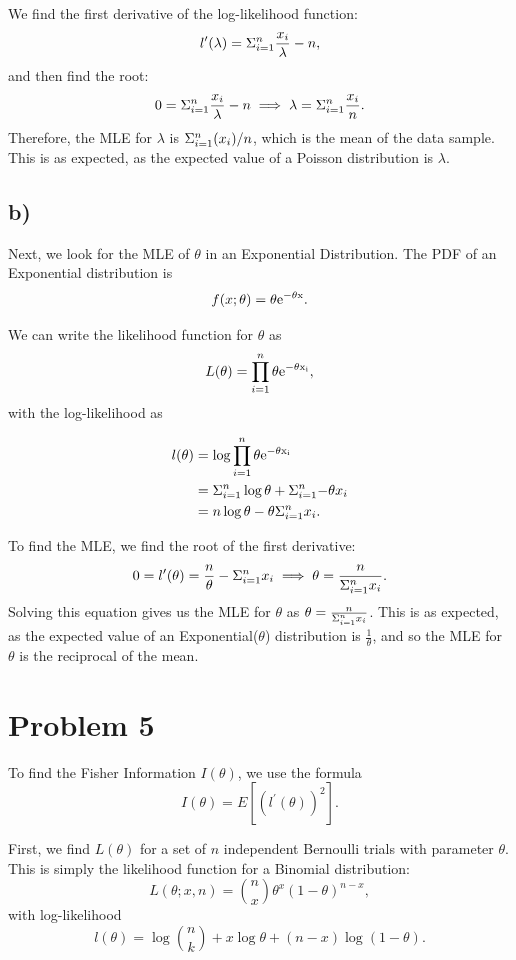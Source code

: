 \documentclass[]{article}
\begin{document}
We find the first derivative of the log-likelihood function: \[
l^{\prime}(\lambda) = \Sigma_{i=1}^{n} \frac{x_i}{\lambda} - n,
\] and then find the root: \[
 0 = \Sigma_{i=1}^{n} \frac{x_i}{\lambda} - n \implies \lambda = \Sigma_{i=1}^{n} \frac{x_i}{n}.
 \] Therefore, the MLE for \(\lambda\) is \(\Sigma_{i=1}^{n}(x_i) / n\), which is
the mean of the data sample. This is as expected, as the expected value
of a Poisson distribution is \(\lambda\).

\subsection{b)}\label{b-3}

Next, we look for the MLE of \(\theta\) in an Exponential Distribution.
The PDF of an Exponential distribution is \[
f(x; \theta) = \theta \rm{e}^{-\theta x}.
\]

We can write the likelihood function for \(\theta\) as \[
L(\theta) = \prod_{i=1}^{n}\theta\rm{e}^{-\theta x_i}, 
\] with the log-likelihood as

\begin{align*}
l(\theta) &= \log{\prod_{i=1}^{n}\theta\rm{e}^{-\theta x_i}} \\
&= \Sigma_{i=1}^{n} \log{\theta} + \Sigma_{i=1}^{n}{-\theta x_i} \\
&= n \log{\theta} - \theta \Sigma_{i=1}^{n} x_i.
\end{align*}

To find the MLE, we find the root of the first derivative: \[
0 = l^{\prime}(\theta) = \frac{n}{\theta} -  \Sigma_{i=1}^{n} x_i \implies \theta = \frac{n}{\Sigma_{i=1}^{n} x_i}.
\] Solving this equation gives us the MLE for \(\theta\) as
\(\theta = \frac{n}{\Sigma_{i=1}^{n} x_i}\). This is as expected, as the expected
value of an Exponential(\(\theta\)) distribution is
\(\frac{1}{\theta}\), and so the MLE for \(\theta\) is the reciprocal of
the mean.

\section{Problem 5}\label{problem-5}

To find the Fisher Information \(I(\theta)\), we use the formula \[
I(\theta) = E[(l^{\prime}(\theta))^2].
\]

First, we find \(L(\theta)\) for a set of \(n\) independent Bernoulli
trials with parameter \(\theta\). This is simply the likelihood function
for a Binomial distribution: \[
L(\theta; x, n) = {n\choose x} \theta^x (1-\theta)^{n-x}, 
\] with log-likelihood \[
l(\theta) = \log{n \choose k} + x\log{\theta} + (n - x) \log{(1 - \theta)}.
\]
\end{document}
